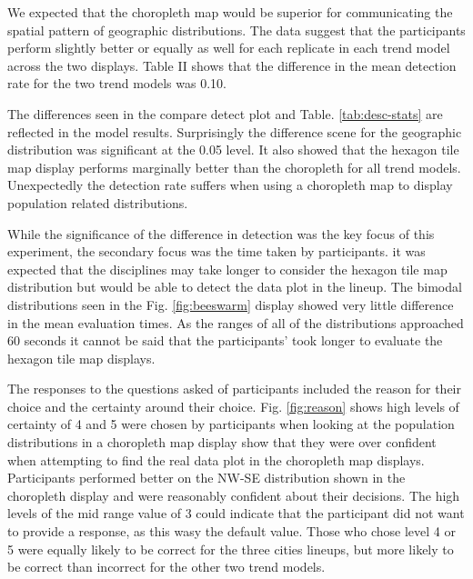 \documentclass[conference,final,]{IEEEtran}
\begin{document}
We expected that the choropleth map would be superior for communicating the spatial pattern of geographic distributions. The data suggest that the participants perform slightly better or equally as well for each replicate in each trend model across the two displays. Table II shows that the difference in the mean detection rate for the two trend models was 0.10.

The differences seen in the compare detect plot and Table. \ref{tab:desc-stats} are reflected in the model results. Surprisingly the difference scene for the geographic distribution was significant at the 0.05 level.
It also showed that the hexagon tile map display performs marginally better than the choropleth for all trend models. Unexpectedly the detection rate suffers when using a choropleth map to display population related distributions.

While the significance of the difference in detection was the key focus of this experiment, the secondary focus was the time taken by participants. it was expected that the disciplines may take longer to consider the hexagon tile map distribution but would be able to detect the data plot in the lineup.
The bimodal distributions seen in the Fig. \ref{fig:beeswarm} display showed very little difference in the mean evaluation times. As the ranges of all of the distributions approached 60 seconds it cannot be said that the participants' took longer to evaluate the hexagon tile map displays.

The responses to the questions asked of participants included the reason for their choice and the certainty around their choice.
Fig. \ref{fig:reason} shows high levels of certainty of 4 and 5 were chosen by participants when looking at the population distributions in a choropleth map display show that they were over confident when attempting to find the real data plot in the choropleth map displays. Participants performed better on the NW-SE distribution shown in the choropleth display and were reasonably confident about their decisions.
The high levels of the mid range value of 3 could indicate that the participant did not want to provide a response, as this wasy the default value. Those who chose level 4 or 5 were equally likely to be correct for the three cities lineups, but more likely to be correct than incorrect for the other two trend models.
\end{document}
